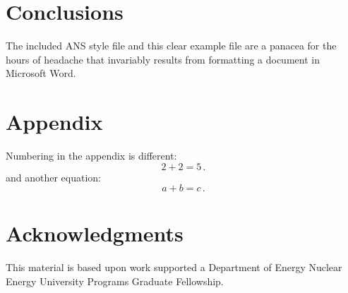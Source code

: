 \documentclass{anstrans}
\begin{document}
\section{Conclusions}

The included ANS style file and this clear example file are a panacea for
the hours of headache that invariably results from formatting a document in
Microsoft Word.

\appendix
\section{Appendix}

Numbering in the appendix is different:
\begin{equation} \label{eq:appendix}
  2 + 2 = 5\,.
\end{equation}
and another equation:
\begin{equation} \label{eq:appendix2}
  a + b = c\,.
\end{equation}

\section{Acknowledgments}
This material is based upon work supported a Department of Energy Nuclear
Energy University Programs Graduate Fellowship.



\end{document}
